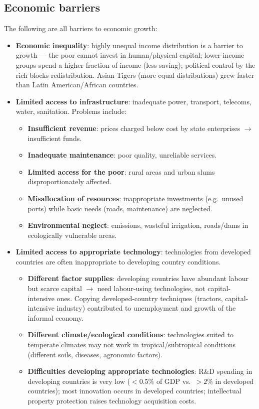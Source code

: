 \subsection{Economic barriers}
The following are all barriers to economic growth:
\begin{itemize}
  \item \textbf{Economic inequality}: highly unequal income distribution is a barrier to growth --- the poor cannot invest in human/physical capital; lower-income groups spend a higher fraction of income (less saving); political control by the rich blocks redistribution. Asian Tigers (more equal distributions) grew faster than Latin American/African countries.
  \item \textbf{Limited access to infrastructure}: inadequate power, transport, telecoms, water, sanitation. Problems include:
  \begin{itemize}
    \item \textbf{Insufficient revenue}: prices charged below cost by state enterprises $\to$ insufficient funds.
    \item \textbf{Inadequate maintenance}: poor quality, unreliable services.
    \item \textbf{Limited access for the poor}: rural areas and urban slums disproportionately affected.
    \item \textbf{Misallocation of resources}: inappropriate investments (e.g.\ unused ports) while basic needs (roads, maintenance) are neglected.
    \item \textbf{Environmental neglect}: emissions, wasteful irrigation, roads/dams in ecologically vulnerable areas.
  \end{itemize}
  \item \textbf{Limited access to appropriate technology}: technologies from developed countries are often inappropriate to developing country conditions.
  \begin{itemize}
    \item \textbf{Different factor supplies}: developing countries have abundant labour but scarce capital $\to$ need labour-using technologies, not capital-intensive ones. Copying developed-country techniques (tractors, capital-intensive industry) contributed to unemployment and growth of the informal economy.
    \item \textbf{Different climate/ecological conditions}: technologies suited to temperate climates may not work in tropical/subtropical conditions (different soils, diseases, agronomic factors).
    \item \textbf{Difficulties developing appropriate technologies}: R\&D spending in developing countries is very low ($<0.5\%$ of GDP vs.\ $>2\%$ in developed countries); most innovation occurs in developed countries; intellectual property protection raises technology acquisition costs.

\end{itemize}
\end{itemize}
